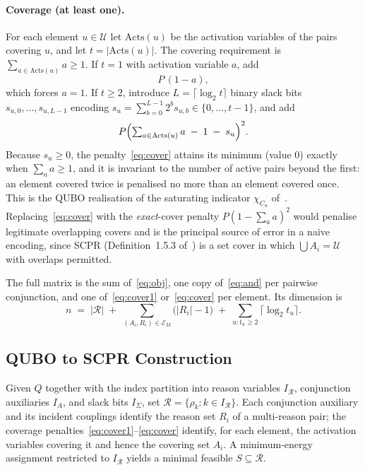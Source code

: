 \documentclass[11pt,a4paper]{article}
\theoremstyle{plain}
\theoremstyle{definition}
\theoremstyle{remark}
\newcommand{\U}{\mathcal{U}}
\newcommand{\R}{\mathcal{R}}
\newcommand{\E}{\mathcal{E}}
\newcommand{\SCPR}{\textup{SCPR}}
\newcommand{\QUBO}{\textup{QUBO}}
\newcommand{\abs}[1]{\lvert #1 \rvert}
\newcommand{\set}[1]{\{#1\}}
\begin{document}
\paragraph{Coverage (at least one).}
For each element $u \in \U$ let $\mathrm{Acts}(u)$ be the activation variables of
the pairs covering $u$, and let $t = \abs{\mathrm{Acts}(u)}$. The covering
requirement is $\sum_{a \in \mathrm{Acts}(u)} a \ge 1$. If $t = 1$ with
activation variable $a$, add
\begin{equation}
  P\,(1 - a),
  \label{eq:cover1}
\end{equation}
which forces $a = 1$. If $t \ge 2$, introduce $L = \lceil \log_2 t \rceil$ binary
slack bits $s_{u,0}, \ldots, s_{u,L-1}$ encoding
$s_u = \sum_{b=0}^{L-1} 2^b s_{u,b} \in \set{0, \ldots, t-1}$, and add
\begin{equation}
  P\Bigl( \textstyle\sum_{a \in \mathrm{Acts}(u)} a \;-\; 1 \;-\; s_u \Bigr)^{2}.
  \label{eq:cover}
\end{equation}
Because $s_u \ge 0$, the penalty~\eqref{eq:cover} attains its minimum (value $0$)
exactly when $\sum_a a \ge 1$, and it is invariant to the number of active pairs
beyond the first: an element covered twice is penalised no more than an element
covered once. This is the \QUBO{} realisation of the saturating indicator
$\chi_{C_u}$ of~\cite{babatunde2025thesis}. Replacing~\eqref{eq:cover} with the
\emph{exact}-cover penalty $P(1 - \sum_a a)^2$ would penalise legitimate
overlapping covers and is the principal source of error in a naive encoding,
since \SCPR{} (Definition~1.5.3 of~\cite{babatunde2025thesis}) is a set cover in
which $\bigcup A_i = \U$ with overlaps permitted.

The full matrix is the sum of~\eqref{eq:obj}, one
copy of~\eqref{eq:and} per pairwise conjunction, and one
of~\eqref{eq:cover1} or~\eqref{eq:cover} per element. Its dimension is
\[
  n \;=\; \abs{\R}
  \;+\; \sum_{(A_i, R_i) \in \E_M} \bigl(\abs{R_i} - 1\bigr)
  \;+\; \sum_{u : t_u \ge 2} \lceil \log_2 t_u \rceil .
\]

\subsection{QUBO to SCPR Construction}

Given $Q$ together with the index partition into reason variables $I_{\R}$,
conjunction auxiliaries $I_A$, and slack bits $I_{\Sigma}$, set
$\R = \set{\rho_k : k \in I_{\R}}$. Each conjunction auxiliary and its incident
couplings identify the reason set $R_i$ of a multi-reason pair; the coverage
penalties~\eqref{eq:cover1}--\eqref{eq:cover} identify, for each element, the
activation variables covering it and hence the covering set $A_i$. A
minimum-energy assignment restricted to $I_{\R}$ yields a minimal feasible
$S \subseteq \R$.
\end{document}
